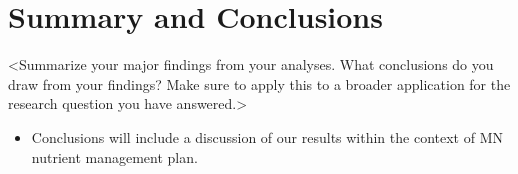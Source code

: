 \documentclass[12pt,]{article}
\providecommand{\tightlist}{%
  \setlength{\itemsep}{0pt}\setlength{\parskip}{0pt}}
\begin{document}
\newpage

\hypertarget{summary-and-conclusions}{%
\section{Summary and Conclusions}\label{summary-and-conclusions}}

\textless{}Summarize your major findings from your analyses. What
conclusions do you draw from your findings? Make sure to apply this to a
broader application for the research question you have
answered.\textgreater{}

\begin{itemize}
\tightlist
\item
  Conclusions will include a discussion of our results within the
  context of MN nutrient management plan.
\end{itemize}
\end{document}
